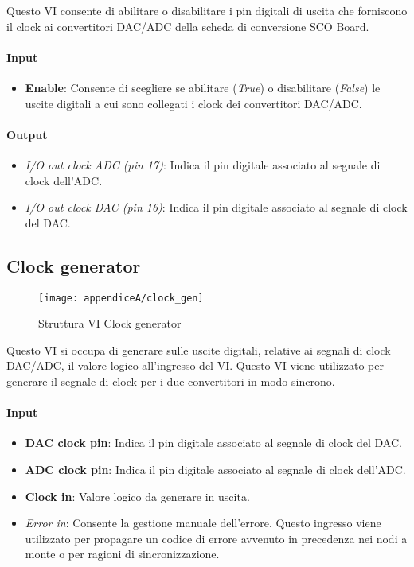 Questo VI consente di abilitare o disabilitare i pin digitali di uscita che forniscono il clock ai convertitori DAC/ADC della scheda di conversione SCO Board.
\paragraph*{Input}
\begin{itemize}
	\item \textbf{Enable}: Consente di scegliere se abilitare (\textit{True}) o disabilitare (\textit{False}) le uscite digitali a cui sono collegati i clock dei convertitori DAC/ADC.
\end{itemize}

\paragraph*{Output}
\begin{itemize}
	\item \textit{I/O out clock ADC (pin 17)}: Indica il pin digitale associato al segnale di clock dell'ADC.
	\item \textit{I/O out clock DAC (pin 16)}: Indica il pin digitale associato al segnale di clock del DAC.
\end{itemize}

\subsection*{Clock generator}

\begin{figure}[H]
	\begin{center}
		\texttt{[image: appendiceA/clock\_gen]}
		\caption{Struttura VI Clock generator}
	\end{center}
\end{figure}

Questo VI si occupa di generare sulle uscite digitali, relative ai segnali di clock DAC/ADC, il valore logico all'ingresso del VI. Questo VI viene utilizzato per generare il segnale di clock per i due convertitori in modo sincrono.

\paragraph*{Input}
\begin{itemize}
	\item \textbf{DAC clock pin}: Indica il pin digitale associato al segnale di clock del DAC.
	\item \textbf{ADC clock pin}: Indica il pin digitale associato al segnale di clock dell'ADC.
	\item \textbf{Clock in}: Valore logico da generare in uscita.
	\item \textit{Error in}: Consente la gestione manuale dell'errore. Questo ingresso viene utilizzato per propagare un codice di errore avvenuto in precedenza nei nodi a monte o per ragioni di sincronizzazione.
\end{itemize}

